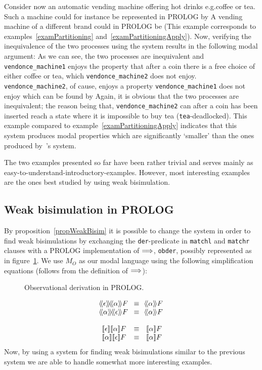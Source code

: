 Consider now an automatic vending machine offering hot drinks e.g.\@ coffee or tea. Such a machine could for instance be represented in PROLOG by
A vending machine of a different brand could in PROLOG be
(This example corresponds to examples~\ref{examPartitioning} and~\ref{examPartitioningApply}). Now, verifying the inequivalence of the two processes using the system results in the following modal argument:
As we can see, the two processes are inequivalent and \verb!vendonce_machine1! enjoys the property that after a coin there is a free choice of either coffee or tea, which \verb!vendonce_machine2! does not enjoy. \verb!vendonce_machine2!, of cause, enjoys a property \verb!vendonce_machine1! does not enjoy which can be found by
%
Again, it is obvious that the two processes are inequivalent; the reason being that, \verb!vendonce_machine2! can after a coin has been inserted reach a state where it is impossible to buy tea (\verb!tea!-deadlocked). This example compared to example~\ref{examPartitioningApply} indicates that this system produces modal properties which are significantly `smaller' than the ones produced by~\cite{VestmarOlesen}'s system.

The two examples presented so far have been rather trivial and serves mainly as easy-to-understand-introductory-examples. However, most interesting examples are the ones best studied by using weak bisimulation.

\subsection{Weak bisimulation in PROLOG}\label{secWeakBisim}
By proposition~\ref{propWeakBisim} it is possible to change the system in order to find weak bisimulations by exchanging the \verb!der!-predicate in \verb!matchl! and \verb!matchr! clauses with a PROLOG implementation of $\stackrel{}{\Longrightarrow}$, \verb!obder!, possibly represented as in figure~\ref{figObderImpl}. We use $M_O$ as our modal language using the following simplification equations (follows from the definition of $\stackrel{}{\Longrightarrow}$):
\begin{figure}
%
\caption{Observational derivation in PROLOG.\label{figObderImpl}}
\end{figure}
\[\begin{array}{c@{\;\;\;}c@{\;\;\;}c}
\obcan{\epsilon}\obcan{\alpha}F & \equiv & \obcan{\alpha}F\\
\obcan{\alpha}\obcan{\epsilon}F & \equiv & \obcan{\alpha}F\\
\\
\obmay{\epsilon}\obmay{\alpha}F & \equiv & \obmay{\alpha}F\\
\obmay{\alpha}\obmay{\epsilon}F & \equiv & \obmay{\alpha}F\\
\end{array}
\]
Now, by using a system for finding weak bisimulations similar to the previous system we are able to handle somewhat more interesting examples.


